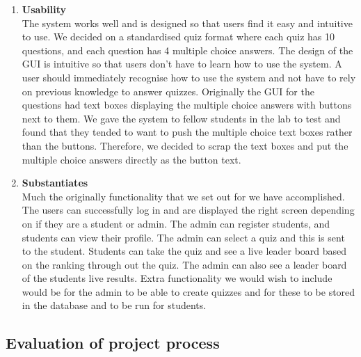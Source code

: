 \begin{enumerate}
	\item \textbf{Usability} \\
		The system works well and is designed so that users find it easy and intuitive to use.
		We decided on a standardised quiz format where each quiz has 10 questions, and each question
		has 4 multiple choice answers. The design of the GUI is intuitive so that users don't
		have to learn how to use the system. A user should immediately recognise how to use the
		system and not have to rely on previous knowledge to answer quizzes. Originally the GUI for 
		the questions had text boxes displaying the multiple choice answers with buttons next to
		them. We gave the system to fellow students in the lab to test and found that they tended
		to want to push the multiple choice text boxes rather than the buttons. Therefore, we decided
		to scrap the text boxes and put the multiple choice answers directly as the button text.
	
	\item \textbf{Substantiates} \\
		Much the originally functionality that we set out for we have accomplished.
		The users can successfully log in and are displayed the right screen depending
		on if they are a student or admin. The admin can register students, and
		students can view their profile. The admin can select a quiz and this is
		sent to the student. Students can take the quiz and see a live leader board
		based on the ranking through out the quiz. The admin can also see a leader
		board of the students live results. Extra functionality we would wish to include
		would be for the admin to be able to create quizzes and for these to be stored in
		the database and to be run for students.

\end{enumerate}

\subsection{Evaluation of project process}
\label{sub:evaluation_of_project_process}


